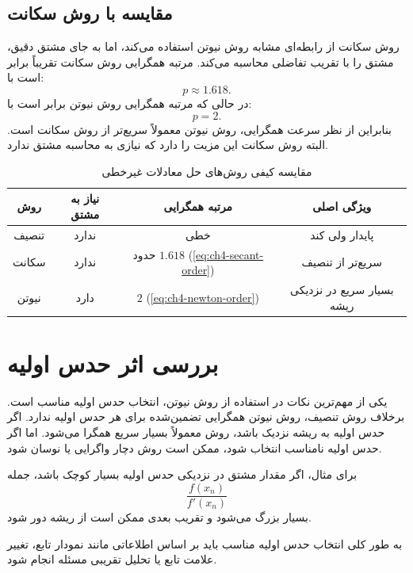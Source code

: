 \subsection{مقایسه با روش سکانت}

روش سکانت از رابطه‌ای مشابه روش نیوتن استفاده می‌کند، اما به جای مشتق دقیق، مشتق را با تقریب تفاضلی محاسبه می‌کند. مرتبه همگرایی روش سکانت تقریباً برابر است با:
\begin{equation}
p \approx 1.618.
\label{eq:ch4-secant-order}
\end{equation}
در حالی که مرتبه همگرایی روش نیوتن برابر است با:
\begin{equation}
p=2.
\label{eq:ch4-newton-order}
\end{equation}
بنابراین از نظر سرعت همگرایی، روش نیوتن معمولاً سریع‌تر از روش سکانت است. البته روش سکانت این مزیت را دارد که نیازی به محاسبه مشتق ندارد.

\begin{table}[H]
\centering
\caption{مقایسه کیفی روش‌های حل معادلات غیرخطی}
\label{tab:method-comparison}
\renewcommand{\arraystretch}{1.4}
\begin{tabular}{c c c c}
\toprule[1.3pt]
روش & نیاز به مشتق & مرتبه همگرایی & ویژگی اصلی \\
\midrule[1pt]
تنصیف & ندارد & خطی & پایدار ولی کند \\
سکانت & ندارد & حدود $1.618$ (\eqref{eq:ch4-secant-order}) & سریع‌تر از تنصیف \\
نیوتن & دارد & $2$ (\eqref{eq:ch4-newton-order}) & بسیار سریع در نزدیکی ریشه \\
\bottomrule[1.3pt]
\end{tabular}
\end{table}

\section{بررسی اثر حدس اولیه}

یکی از مهم‌ترین نکات در استفاده از روش نیوتن، انتخاب حدس اولیه مناسب است. برخلاف روش تنصیف، روش نیوتن همگرایی تضمین‌شده برای هر حدس اولیه ندارد. اگر حدس اولیه به ریشه نزدیک باشد، روش معمولاً بسیار سریع همگرا می‌شود. اما اگر حدس اولیه نامناسب انتخاب شود، ممکن است روش دچار واگرایی یا نوسان شود.

برای مثال، اگر مقدار مشتق در نزدیکی حدس اولیه بسیار کوچک باشد، جمله
\[
\frac{f(x_n)}{f'(x_n)}
\]
بسیار بزرگ می‌شود و تقریب بعدی ممکن است از ریشه دور شود.

به طور کلی انتخاب حدس اولیه مناسب باید بر اساس اطلاعاتی مانند نمودار تابع، تغییر علامت تابع یا تحلیل تقریبی مسئله انجام شود.

